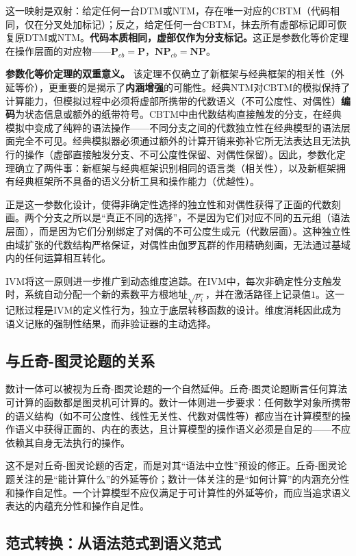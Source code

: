 \documentclass{ctexart}
\begin{document}
	这一映射是双射：给定任何一台DTM或NTM，存在唯一对应的CBTM（代码相同，仅在分叉处加标记）；反之，给定任何一台CBTM，抹去所有虚部标记即可恢复原DTM或NTM。\textbf{代码本质相同，虚部仅作为分支标记。}这正是参数化等价定理在操作层面的对应物——$\mathbf{P}_{cb} = \mathbf{P}$，$\mathbf{NP}_{cb} = \mathbf{NP}$。
	
	\textbf{参数化等价定理的双重意义。} 该定理不仅确立了新框架与经典框架的相关性（外延等价），更重要的是揭示了\textbf{内涵增强}的可能性。经典NTM对CBTM的模拟保持了计算能力，但模拟过程中必须将虚部所携带的代数语义（不可公度性、对偶性）\textbf{编码}为状态信息或额外的纸带符号。CBTM中由代数结构直接触发的分支，在经典模拟中变成了纯粹的语法操作——不同分支之间的代数独立性在经典模型的语法层面完全不可见。经典模拟器必须通过额外的计算开销来弥补它所无法表达且无法执行的操作（虚部直接触发分支、不可公度性保留、对偶性保留）。因此，参数化定理确立了两件事：新框架与经典框架识别相同的语言类（相关性），以及新框架拥有经典框架所不具备的语义分析工具和操作能力（优越性）。
	
	正是这一参数化设计，使得非确定性选择的独立性和对偶性获得了正面的代数刻画。两个分支之所以是``真正不同的选择''，不是因为它们对应不同的五元组（语法层面），而是因为它们分别绑定了对偶的不可公度生成元（代数层面）。这种独立性由域扩张的代数结构严格保证，对偶性由伽罗瓦群的作用精确刻画，无法通过基域内的任何运算相互转化。
	
	IVM将这一原则进一步推广到动态维度追踪。在IVM中，每次非确定性分支触发时，系统自动分配一个新的素数平方根地址$\sqrt{p_i}$，并在激活路径上记录值$1$。这一记账过程是IVM的定义性行为，独立于底层转移函数的设计。维度消耗因此成为语义记账的强制性结果，而非验证器的主动选择。
	
	\subsection{与丘奇-图灵论题的关系}
	
	数计一体可以被视为丘奇-图灵论题的一个自然延伸。丘奇-图灵论题断言任何算法可计算的函数都是图灵机可计算的。数计一体则进一步要求：任何数学对象所携带的语义结构（如不可公度性、线性无关性、代数对偶性等）都应当在计算模型的操作语义中获得正面的、内在的表达，且计算模型的操作语义必须是自足的——不应依赖其自身无法执行的操作。
	
	这不是对丘奇-图灵论题的否定，而是对其``语法中立性''预设的修正。丘奇-图灵论题关注的是``能计算什么''的外延等价；数计一体关注的是``如何计算''的内涵充分性和操作自足性。一个计算模型不应仅满足于可计算性的外延等价，而应当追求语义表达的内蕴充分性和操作自足性。
	
	\subsection{范式转换：从语法范式到语义范式}
	
\end{document}

